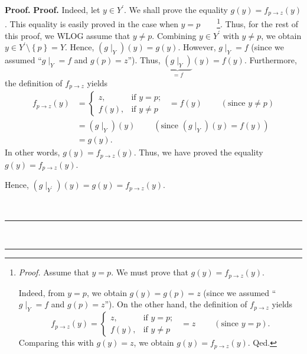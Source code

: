 \documentclass[numbers=enddot,12pt,final,onecolumn,notitlepage]{scrartcl}%
\numberwithin{exer}{section}
\theoremstyle{definition}
\newenvironment{proof}[1][Proof]{\noindent\textbf{#1.} }{\ \rule{0.5em}{0.5em}}
\newenvironment{verlong}{}{}
\begin{document}
\begin{verlong}
\begin{proof}
\begin{proof}
Indeed, let $y\in Y^{\prime}$. We shall prove the equality $g\left(  y\right)
=f_{p\rightarrow z}\left(  y\right)  $. This equality is easily proved in the
case when $y=p$\ \ \ \ \footnote{\textit{Proof.} Assume that $y=p$. We must
prove that $g\left(  y\right)  =f_{p\rightarrow z}\left(  y\right)  $.
\par
Indeed, from $y=p$, we obtain $g\left(  y\right)  =g\left(  p\right)  =z$
(since we assumed \textquotedblleft$\left.  g\mid_{Y}\right.  =f$ and
$g\left(  p\right)  =z$\textquotedblright). On the other hand, the definition
of $f_{p\rightarrow z}$ yields%
\[
f_{p\rightarrow z}\left(  y\right)  =%
\begin{cases}
z, & \text{if }y=p;\\
f\left(  y\right)  , & \text{if }y\neq p
\end{cases}
\ \ =z\ \ \ \ \ \ \ \ \ \ \left(  \text{since }y=p\right)  .
\]
Comparing this with $g\left(  y\right)  =z$, we obtain $g\left(  y\right)
=f_{p\rightarrow z}\left(  y\right)  $. Qed.}. Thus, for the rest of this
proof, we WLOG assume that $y\neq p$. Combining $y\in Y^{\prime}$ with $y\neq
p$, we obtain $y\in Y^{\prime}\setminus\left\{  p\right\}  =Y$. Hence,
$\left(  g\mid_{Y}\right)  \left(  y\right)  =g\left(  y\right)  $. However,
$\left.  g\mid_{Y}\right.  =f$ (since we assumed \textquotedblleft$\left.
g\mid_{Y}\right.  =f$ and $g\left(  p\right)  =z$\textquotedblright). Thus,
$\underbrace{\left(  g\mid_{Y}\right)  }_{=f}\left(  y\right)  =f\left(
y\right)  $. Furthermore, the definition of $f_{p\rightarrow z}$ yields%
\begin{align*}
f_{p\rightarrow z}\left(  y\right)   &  =%
\begin{cases}
z, & \text{if }y=p;\\
f\left(  y\right)  , & \text{if }y\neq p
\end{cases}
\ \ =f\left(  y\right)  \ \ \ \ \ \ \ \ \ \ \left(  \text{since }y\neq
p\right) \\
&  =\left(  g\mid_{Y}\right)  \left(  y\right)  \ \ \ \ \ \ \ \ \ \ \left(
\text{since }\left(  g\mid_{Y}\right)  \left(  y\right)  =f\left(  y\right)
\right) \\
&  =g\left(  y\right)  .
\end{align*}
In other words, $g\left(  y\right)  =f_{p\rightarrow z}\left(  y\right)  $.
Thus, we have proved the equality $g\left(  y\right)  =f_{p\rightarrow
z}\left(  y\right)  $.

Hence, $\left(  g\mid_{Y^{\prime}}\right)  \left(  y\right)  =g\left(
y\right)  =f_{p\rightarrow z}\left(  y\right)  $.


\end{proof}
\end{proof}
\end{verlong}
\end{document}
